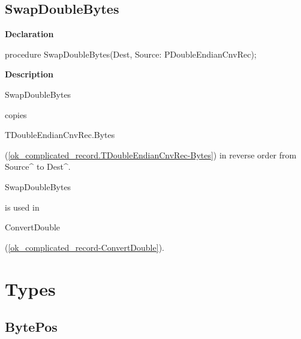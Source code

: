 \documentclass{report}
\newif\ifpdf
\begin{document}
\subsection*{SwapDoubleBytes}
\fi
\label{ok_complicated_record-SwapDoubleBytes}
\begin{list}{}{
\setlength{\itemindent}{0cm}
\setlength{\listparindent}{0cm}
\setlength{\leftmargin}{\evensidemargin}
\addtolength{\leftmargin}{\tmplength}
\settowidth{\labelsep}{X}
\addtolength{\leftmargin}{\labelsep}
\setlength{\labelwidth}{\tmplength}
}
\item[\textbf{Declaration}\hfill]
\ifpdf
\begin{flushleft}
\fi
\begin{ttfamily}
procedure SwapDoubleBytes(Dest, Source: PDoubleEndianCnvRec);\end{ttfamily}

\ifpdf
\end{flushleft}
\fi

\par
\item[\textbf{Description}]
\begin{ttfamily}SwapDoubleBytes\end{ttfamily} copies \begin{ttfamily}TDoubleEndianCnvRec.Bytes\end{ttfamily}(\ref{ok_complicated_record.TDoubleEndianCnvRec-Bytes}) in reverse order from Source{\^{}} to Dest{\^{}}.\hfill\vspace*{1ex}

 \begin{ttfamily}SwapDoubleBytes\end{ttfamily} is used in \begin{ttfamily}ConvertDouble\end{ttfamily}(\ref{ok_complicated_record-ConvertDouble}).

\end{list}
\section{Types}
\ifpdf
\subsection*{\large{\textbf{BytePos}}\normalsize\hspace{1ex}\hrulefill}
\else
\end{document}
